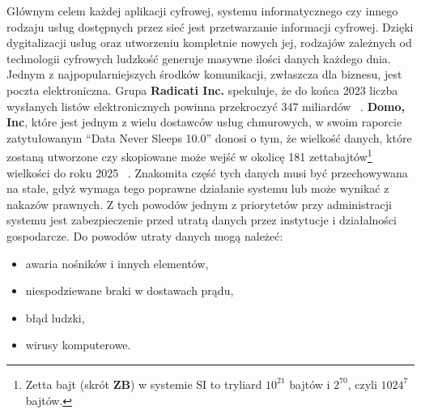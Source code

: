 Głównym celem każdej aplikacji cyfrowej, systemu informatycznego czy innego rodzaju usług dostępnych przez sieć jest przetwarzanie informacji cyfrowej. Dzięki dygitalizacji usług oraz utworzeniu kompletnie nowych jej, rodzajów zależnych od technologii cyfrowych ludzkość generuje masywne ilości danych każdego dnia. Jednym z najpopularniejszych środków komunikacji, zwłaszcza dla biznesu, jest poczta elektroniczna. Grupa \textbf{Radicati Inc.} spekuluje, że do końca 2023 liczba wysłanych listów elektronicznych powinna przekroczyć 347 miliardów ~\cite{radicati2019}.
\textbf{Domo, Inc}, które jest jednym z wielu dostawców usług chmurowych, w swoim raporcie zatytułowanym 
\foreignquote{english}{Data Never Sleeps 10.0} donosi o tym, że wielkość danych, które zostaną utworzone czy skopiowane może wejść w okolicę 181 zettabajtów\footnote{Zetta bajt (skrót \textbf{ZB}) w systemie SI to tryliard $10^{21}$ bajtów i $2^{70}$, czyli $1024^{7}$ bajtów.} wielkości do roku 2025 ~\cite{domo10}. Znakomita część tych danych musi być przechowywana na stałe, gdyż wymaga tego poprawne działanie systemu lub może wynikać z nakazów prawnych. Z tych powodów jednym z priorytetów przy administracji systemu jest zabezpieczenie przed utratą danych przez instytucje i działalności gospodarcze.
Do powodów utraty danych mogą należeć:
\begin{itemize}
    \item awaria nośników i innych elementów,
    \item niespodziewane braki w dostawach prądu,
    \item błąd ludzki,
    \item wirusy komputerowe.
\end{itemize}

